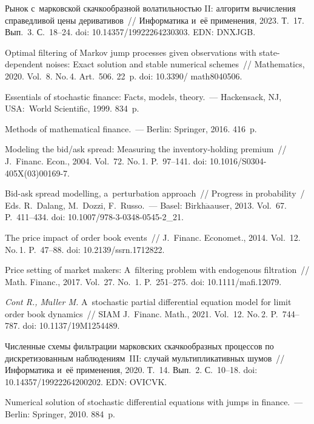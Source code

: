 \begin{multicols}{2}
{{\begin{thebibliography}{99}
 Рынок с~марковской скачкообразной волатильностью II: алгоритм 
вычисления справедливой цены деривативов~// Информатика и~её 
применения, 2023. Т.~17. Вып.~3. С.~18--24. doi: 10.14357/19922264230303. EDN: DNXJGB.

 Optimal filtering of Markov jump processes given 
observations with state-dependent \mbox{noises}: Exact solution and stable numerical 
schemes~// Mathematics, 2020. Vol.~8. No.\,4. Art.~506. 22~p. doi: 10.3390/ math8040506.

  Essentials of stochastic finance: Facts, models, 
theory.~--- Hackensack, NJ, USA:~World Scientific, 1999. 834~p.

 Methods of mathematical finance.~--- Berlin: 
Springer, 2016. 416~p.

Modeling the bid/ask spread: Measuring the inventory-holding premium~//
J.~Financ. Econ., 2004.
Vol.~72. No.\,1. P.~97--141. doi: 10.1016/S0304-405X(03)00169-7.

   Bid-ask spread modelling, a~perturbation approach~//
 Progress in probability~/ Eds. R.~Dalang, M.~Dozzi, F.~Russo.~---  Basel: Birkh$\ddot{\mbox{a}}$auser, 
2013. Vol.~67. P.~411--434. doi: 10.1007/978-3-0348-0545-2\_21.

 The price impact of order book events~//  
J.~Financ. Economet., 2014. Vol.~12. No.\,1. P.~47--88. doi: 10.2139/ssrn.1712822.


  Price setting of market makers: A~filtering problem 
with endogenous filtration~// Math. Financ., 2017. Vol.~27. No.~1. 
P.~251--275. doi: 10.1111/mafi.12079.

{\it Cont R., M$\ddot{\mbox{u}}$ller M.} A~stochastic partial differential equation model for 
limit order book dynamics~//
SIAM J.~Financ. Math., 2021. Vol.~12. No.\,2.  P.~744--787. doi: 10.1137/19M1254489.


 Численные схемы фильтрации марковских скачкообразных процессов 
по дискретизованным наблюдениям~III: случай мультипликативных шумов~// 
Информатика и~её применения, 2020. Т.~14. Вып.~2. С.~10--18. doi: 10.14357/19922264200202. EDN: OVICVK.

 Numerical solution of stochastic differential 
equations with jumps in finance.~--- Berlin: Springer, 2010. 884~p.
\end{thebibliography}

 }
 }

\end{multicols}

